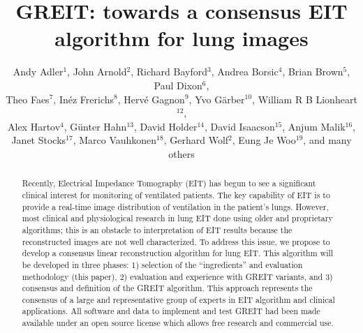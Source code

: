 \documentclass[letterpaper,twocolumn,11pt]{article}
\begin{document}
\title{\bf GREIT: towards a consensus EIT algorithm for lung images}

\author{Andy Adler$^{1}$,
        John Arnold$^{2}$,
        Richard Bayford$^{3}$,
        Andrea Borsic$^{4}$,
        Brian Brown$^{5}$,
        Paul Dixon$^{6}$,
\\
        Theo Faes$^{7}$,
        In\'ez Frerichs$^{8}$,
        Herv\'e Gagnon$^{9}$,
        Yvo G\"arber$^{10}$,
        William R B Lionheart$^{12}$,
\\
        Alex Hartov$^{4}$,
        G\"unter Hahn$^{13}$,
        David Holder$^{14}$,
        David Isaacson$^{15}$,
        Anjum Malik$^{16}$,
\\
        Janet Stocks$^{17}$,
        Marco Vauhkonen$^{18}$,
        Gerhard Wolf$^{2}$,
        Eung Je Woo$^{19}$,
        and many others%
       }

\date{}
\maketitle




\begin{abstract}
Recently, Electrical Impedance Tomography (EIT) has begun to see a
significant clinical interest for monitoring of
ventilated patients.  The key capability of EIT is to
provide a real-time image distribution of ventilation in
the patient's lungs.
However, most clinical and physiological research in lung EIT
done using older and proprietary algorithms; this is
an obstacle to interpretation of EIT results because the
reconstructed images are not well characterized.
To address this issue, we propose to develop a 
consensus linear reconstruction algorithm for lung EIT.
This algorithm will be developed in three phases:
1) selection of the ``ingredients'' and evaluation 
methodology (this paper),
2) evaluation and experience with GREIT variants, and
3) consensus and definition of the GREIT algorithm.
This approach represents the consensus of a large and representative
group of experts in EIT algorithm and clinical applications.
All software and data to implement and test GREIT had been
made available under an open source license which allows free
research and commercial use.
\end{abstract}

\end{document}
